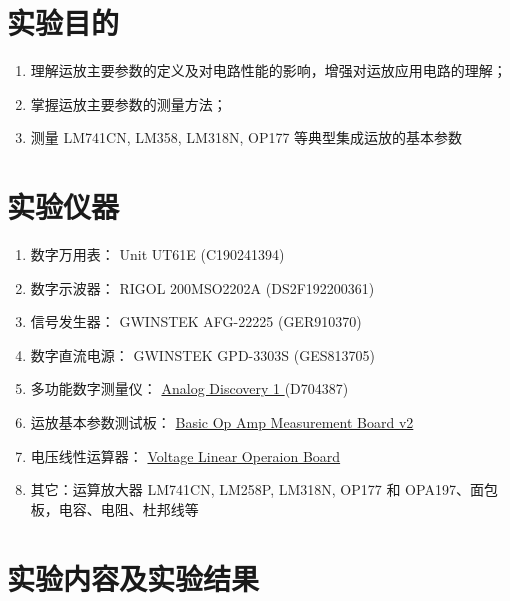 \documentclass[UTF8]{article}
\begin{document}
\section{实验目的}

\begin{enumerate}
\item 理解运放主要参数的定义及对电路性能的影响，增强对运放应用电路的理解；
\item 掌握运放主要参数的测量方法；
\item 测量 LM741CN, LM358, LM318N, OP177 等典型集成运放的基本参数
\end{enumerate}


\section{实验仪器}

\begin{enumerate}
    \item 数字万用表： Unit UT61E (C190241394)
    \item 数字示波器： RIGOL 200MSO2202A (DS2F192200361)
    \item 信号发生器： GWINSTEK AFG-22225 (GER910370)
    \item 数字直流电源： GWINSTEK GPD-3303S (GES813705) 
    \item 多功能数字测量仪： 
    \href{https://digilent.com/reference/test-and-measurement/analog-discovery/start
    }{ %
    Analog Discovery 1
    } 
    (D704387)
    \item 运放基本参数测试板：%
    \href{https://yidingg.github.io/YiDingg/\#/ElectronicDesigns/Basic\%20Op\%20Amp\%20Measurement\%20Board\%20v2
    }{ %
    Basic Op Amp Measurement Board v2
    }
    \item 电压线性运算器：
    \href{https://yidingg.github.io/YiDingg/#/ElectronicDesigns/Voltage\%20Linear\%20Operation\%20Board
    }{ %
    Voltage Linear Operaion Board
    }
    \item 其它：运算放大器 LM741CN, LM258P, LM318N, OP177 和 OPA197、面包板，电容、电阻、杜邦线等
\end{enumerate}





\newpage
\section{实验内容及实验结果}
\end{document}

